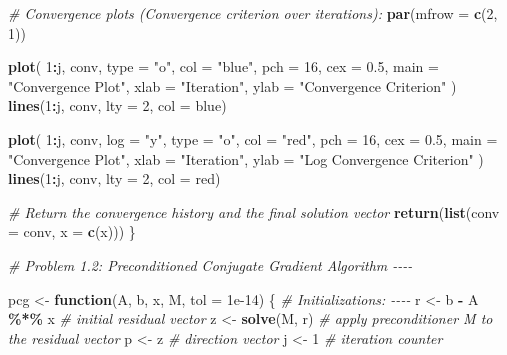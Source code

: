 \documentclass[
]{article}
\newenvironment{Shaded}{\begin{snugshade}}{\end{snugshade}}
\newcommand{\AttributeTok}[1]{\textcolor[rgb]{0.13,0.29,0.53}{#1}}
\newcommand{\CommentTok}[1]{\textcolor[rgb]{0.56,0.35,0.01}{\textit{#1}}}
\newcommand{\ControlFlowTok}[1]{\textcolor[rgb]{0.13,0.29,0.53}{\textbf{#1}}}
\newcommand{\DecValTok}[1]{\textcolor[rgb]{0.00,0.00,0.81}{#1}}
\newcommand{\FloatTok}[1]{\textcolor[rgb]{0.00,0.00,0.81}{#1}}
\newcommand{\FunctionTok}[1]{\textcolor[rgb]{0.13,0.29,0.53}{\textbf{#1}}}
\newcommand{\NormalTok}[1]{#1}
\newcommand{\OtherTok}[1]{\textcolor[rgb]{0.56,0.35,0.01}{#1}}
\newcommand{\SpecialCharTok}[1]{\textcolor[rgb]{0.81,0.36,0.00}{\textbf{#1}}}
\newcommand{\StringTok}[1]{\textcolor[rgb]{0.31,0.60,0.02}{#1}}
\begin{document}
\begin{Shaded}
\begin{Highlighting}[]
  \CommentTok{\# Convergence plots (Convergence criterion over iterations):}
  \FunctionTok{par}\NormalTok{(}\AttributeTok{mfrow =} \FunctionTok{c}\NormalTok{(}\DecValTok{2}\NormalTok{, }\DecValTok{1}\NormalTok{))}
  
  \FunctionTok{plot}\NormalTok{(}
    \DecValTok{1}\SpecialCharTok{:}\NormalTok{j,}
\NormalTok{    conv,}
    \AttributeTok{type =} \StringTok{"o"}\NormalTok{,}
    \AttributeTok{col =} \StringTok{"blue"}\NormalTok{,}
    \AttributeTok{pch =} \DecValTok{16}\NormalTok{,}
    \AttributeTok{cex =} \FloatTok{0.5}\NormalTok{,}
    \AttributeTok{main =} \StringTok{"Convergence Plot"}\NormalTok{,}
    \AttributeTok{xlab =} \StringTok{"Iteration"}\NormalTok{,}
    \AttributeTok{ylab =} \StringTok{"Convergence Criterion"}
\NormalTok{  )}
  \FunctionTok{lines}\NormalTok{(}\DecValTok{1}\SpecialCharTok{:}\NormalTok{j, conv, }\AttributeTok{lty =} \DecValTok{2}\NormalTok{, }\AttributeTok{col =} \StringTok{\textquotesingle{}blue\textquotesingle{}}\NormalTok{)}
  
  \FunctionTok{plot}\NormalTok{(}
    \DecValTok{1}\SpecialCharTok{:}\NormalTok{j,}
\NormalTok{    conv,}
    \AttributeTok{log =} \StringTok{"y"}\NormalTok{,}
    \AttributeTok{type =} \StringTok{"o"}\NormalTok{,}
    \AttributeTok{col =} \StringTok{"red"}\NormalTok{,}
    \AttributeTok{pch =} \DecValTok{16}\NormalTok{,}
    \AttributeTok{cex =} \FloatTok{0.5}\NormalTok{,}
    \AttributeTok{main =} \StringTok{"Convergence Plot"}\NormalTok{,}
    \AttributeTok{xlab =} \StringTok{"Iteration"}\NormalTok{,}
    \AttributeTok{ylab =} \StringTok{"Log Convergence Criterion"}
\NormalTok{  )}
  \FunctionTok{lines}\NormalTok{(}\DecValTok{1}\SpecialCharTok{:}\NormalTok{j, conv, }\AttributeTok{lty =} \DecValTok{2}\NormalTok{, }\AttributeTok{col =} \StringTok{\textquotesingle{}red\textquotesingle{}}\NormalTok{)}
  
  \CommentTok{\# Return the convergence history and the final solution vector}
  \FunctionTok{return}\NormalTok{(}\FunctionTok{list}\NormalTok{(}\AttributeTok{conv =}\NormalTok{ conv, }\AttributeTok{x =} \FunctionTok{c}\NormalTok{(x)))}
\NormalTok{\}}


\CommentTok{\# Problem 1.2: Preconditioned Conjugate Gradient Algorithm {-}{-}{-}{-}}

\NormalTok{pcg }\OtherTok{\textless{}{-}} \ControlFlowTok{function}\NormalTok{(A, b, x, M, }\AttributeTok{tol =} \FloatTok{1e{-}14}\NormalTok{) \{}
  \CommentTok{\# Initializations: {-}{-}{-}{-}}
\NormalTok{  r }\OtherTok{\textless{}{-}}\NormalTok{ b }\SpecialCharTok{{-}}\NormalTok{ A }\SpecialCharTok{\%*\%}\NormalTok{ x  }\CommentTok{\# initial residual vector}
\NormalTok{  z }\OtherTok{\textless{}{-}} \FunctionTok{solve}\NormalTok{(M, r)  }\CommentTok{\# apply preconditioner M to the residual vector}
\NormalTok{  p }\OtherTok{\textless{}{-}}\NormalTok{ z  }\CommentTok{\# direction vector}
\NormalTok{  j }\OtherTok{\textless{}{-}} \DecValTok{1}  \CommentTok{\# iteration counter}
  

\end{Highlighting}
\end{Shaded}
\end{document}
